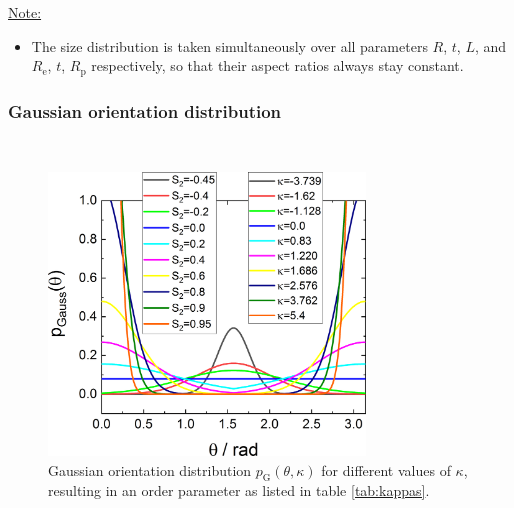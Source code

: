 \vspace{5mm}

\underline{Note:}
\begin{itemize}
\item The size distribution is taken simultaneously over all parameters $R$, $t$, $L$, and $R_\mathrm{e}$, $t$, $R_\mathrm{p}$ respectively, so that their aspect ratios always stay constant.
\end{itemize}

\newpage
\subsubsection{Gaussian orientation distribution}
\label{sect:ShearedCylinderGaussian}
~\\

\begin{figure}[htb]
\includegraphics[width=0.75\textwidth]{../images/form_factor/cylindrical_obj/pGaussGr.png}
\caption{Gaussian orientation distribution $p_\mathrm{G}(\theta,\kappa)$ for different values of $\kappa$, resulting in an order parameter as listed in table \ref{tab:kappas}.}
\label{fig:pGaussGr}
\end{figure}

